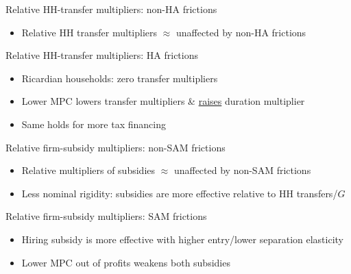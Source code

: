 \documentclass[9pt]{beamer}
\begin{document}
%
\begin{frame}{Relative HH-transfer multipliers: non-HA frictions}

\centering
\begin{small}
\setlength\tabcolsep{2.5pt} 
  
\end{small}
\begin{itemize}
\item Relative HH transfer multipliers $\approx$ unaffected by non-HA frictions
\end{itemize}
\end{frame}
%
\begin{frame}{Relative HH-transfer multipliers: HA frictions}

\centering
\begin{small}
\setlength\tabcolsep{2.5pt} 
  
\end{small}
\begin{itemize}
\item Ricardian households: zero transfer multipliers
\item Lower MPC lowers transfer multipliers \& \uline{raises} duration multiplier
\item Same holds for more tax financing
\end{itemize}
\end{frame}
%
\begin{frame}{Relative firm-subsidy multipliers: non-SAM frictions}

\centering
\begin{small}
\setlength\tabcolsep{2.5pt} 
  
\end{small}

\begin{itemize}
\item Relative multipliers of subsidies $\approx$ unaffected by non-SAM
frictions
\item Less nominal rigidity: subsidies are more effective relative to HH transfers/$G$
\end{itemize}
\end{frame}
%
\begin{frame}{Relative firm-subsidy multipliers: SAM frictions}

\centering
\begin{small}
\setlength\tabcolsep{2.5pt} 
  
\end{small}

\begin{itemize}
\item {\small Hiring subsidy is more effective with higher entry/lower separation
elasticity}{\small\par}
\item Lower MPC out of profits weakens both subsidies
\end{itemize}
\end{frame}
\end{document}

